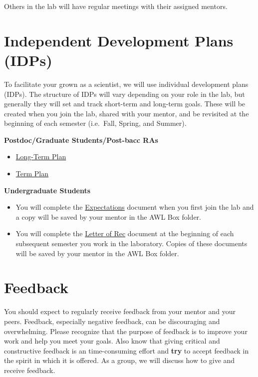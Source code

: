 \documentclass[
]{book}
\begin{document}
Others in the lab will have regular meetings with their assigned mentors.

\hypertarget{independent-development-plans-idps}{%
\section{Independent Development Plans (IDPs)}\label{independent-development-plans-idps}}

To facilitate your grown as a scientist, we will use individual development plans (IDPs). The structure of IDPs will vary depending on your role in the lab, but generally they will set and track short-term and long-term goals. These will be created when you join the lab, shared with your mentor, and be revisited at the beginning of each semester (i.e.~Fall, Spring, and Summer).

\textbf{Postdoc/Graduate Students/Post-bacc RAs}

\begin{itemize}
\item
  \href{https://osf.io/6djsm/}{Long-Term Plan}
\item
  \href{https://osf.io/qfm3r/}{Term Plan}
\end{itemize}

\textbf{Undergraduate Students}

\begin{itemize}
\item
  You will complete the \href{docs/Research_Experience_Expectations.dotx}{Expectations} document when you first join the lab and a copy will be saved by your mentor in the AWL Box folder.
\item
  You will complete the \href{docs/Letter\%20of\%20Recommendation.dotx}{Letter of Rec} document at the beginning of each subsequent semester you work in the laboratory. Copies of these documents will be saved by your mentor in the AWL Box folder.
\end{itemize}

\hypertarget{feedback}{%
\section{Feedback}\label{feedback}}

You should expect to regularly receive feedback from your mentor and your peers. Feedback, especially negative feedback, can be discouraging and overwhelming. Please recognize that the purpose of feedback is to improve your work and help you meet your goals. Also know that giving critical and constructive feedback is an time-consuming effort and \textbf{try} to accept feedback in the spirit in which it is offered. As a group, we will discuss how to give and receive feedback.
\end{document}
